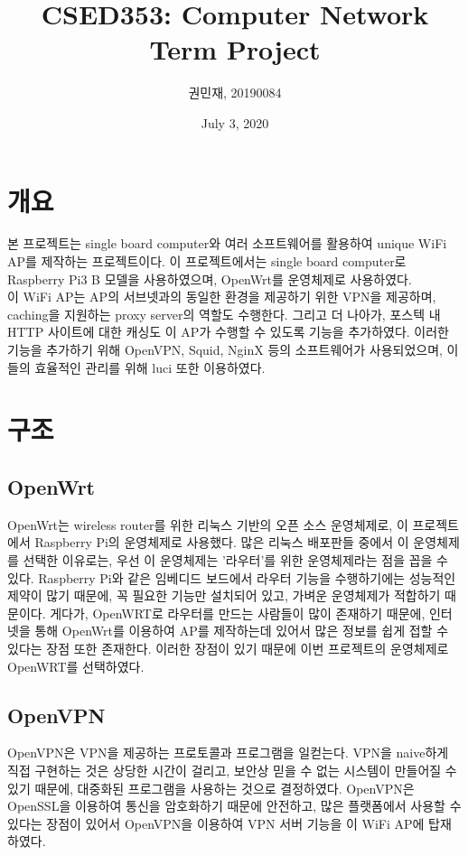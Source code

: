 \documentclass{article}
\begin{document}
    \author{\large 권민재, 20190084}
    \title{\Large\textbf{CSED353: Computer Network Term Project}}
    \date{\small July 3, 2020}
    \maketitle
    \newpage

    \tableofcontents

    \newpage
    \section{개요}
    본 프로젝트는 single board computer와 여러 소프트웨어를 활용하여 unique WiFi AP를 제작하는 프로젝트이다.
    이 프로젝트에서는 single board computer로 Raspberry Pi3 B 모델을 사용하였으며, OpenWrt를 운영체제로 사용하였다. \\
    이 WiFi AP는 AP의 서브넷과의 동일한 환경을 제공하기 위한 VPN을 제공하며, caching을 지원하는 proxy server의 역할도 수행한다.
    그리고 더 나아가, 포스텍 내 HTTP 사이트에 대한 캐싱도 이 AP가 수행할 수 있도록 기능을 추가하였다.
    이러한 기능을 추가하기 위해 OpenVPN, Squid, NginX 등의 소프트웨어가 사용되었으며, 이들의 효율적인 관리를 위해 luci 또한 이용하였다.


    \section{구조}

    \subsection{OpenWrt}
    OpenWrt는 wireless router를 위한 리눅스 기반의 오픈 소스 운영체제로, 이 프로젝트에서 Raspberry Pi의 운영체제로 사용했다.
    많은 리눅스 배포판들 중에서 이 운영체제를 선택한 이유로는, 우선 이 운영체제는 '라우터'를 위한 운영체제라는 점을 꼽을 수 있다.
    Raspberry Pi와 같은 임베디드 보드에서 라우터 기능을 수행하기에는 성능적인 제약이 많기 때문에,
    꼭 필요한 기능만 설치되어 있고, 가벼운 운영체제가 적합하기 때문이다. 게다가, OpenWRT로 라우터를 만드는 사람들이 많이 존재하기 때문에,
    인터넷을 통해 OpenWrt를 이용하여 AP를 제작하는데 있어서 많은 정보를 쉽게 접할 수 있다는 장점 또한 존재한다.
    이러한 장점이 있기 때문에 이번 프로젝트의 운영체제로 OpenWRT를 선택하였다.
    \subsection{OpenVPN}
    OpenVPN은 VPN을 제공하는 프로토콜과 프로그램을 일컫는다.
    VPN을 naive하게 직접 구현하는 것은 상당한 시간이 걸리고, 보안상 믿을 수 없는 시스템이 만들어질 수 있기 때문에,
    대중화된 프로그램을 사용하는 것으로 결정하였다.
    OpenVPN은 OpenSSL을 이용하여 통신을 암호화하기 때문에 안전하고, 많은 플랫폼에서 사용할 수 있다는 장점이 있어서
    OpenVPN을 이용하여 VPN 서버 기능을 이 WiFi AP에 탑재하였다.
\end{document}

